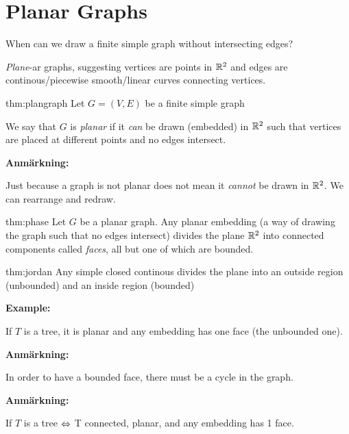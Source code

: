 \section{Planar Graphs}\par
\noindent When can we draw a finite simple graph without intersecting edges?
\par\bigskip
\noindent\textit{Plane}-ar graphs, suggesting vertices are points in $\mathbb{R}^2$ and edges are continous/piecewise smooth/linear curves connecting vertices. 
\par\bigskip
\begin{theo}{thm:plangraph}
  Let $G = (V,E)$ be a finite simple graph
  \par\bigskip
  \noindent We say that $G$ is \textit{planar} if it \textit{can} be drawn (embedded) in $\mathbb{R}^2$ such that vertices are placed at different points and no edges intersect.
\end{theo}
\par\bigskip
\noindent\textbf{Anmärkning:}\par
\noindent Just because a graph is not planar does not mean it \textit{cannot} be drawn in $\mathbb{R}^2$. We can rearrange and redraw.
\par\bigskip
\begin{theo}[Faces]{thm:phase}
  Let $G$ be a planar graph. Any planar embedding (a way of drawing the graph such that no edges intersect) divides the plane $\mathbb{R}^2$ into connected components called \textit{faces}, all but one of which are bounded. 
\end{theo}
\par\bigskip
\begin{theo}{thm:jordan}
  Any simple closed continous divides the plane into an outside region (unbounded) and an inside region (bounded)
\end{theo}
\par\bigskip
\noindent\textbf{Example:}\par
\noindent If $T$ is a tree, it is planar and any embedding has one face (the unbounded one).
\par\bigskip
\noindent\textbf{Anmärkning:}\par
\noindent In order to have a bounded face, there must be a cycle in the graph. 
\par\bigskip
\noindent\textbf{Anmärkning:}\par
\noindent If $T$ is a tree $\Leftrightarrow$ T connected, planar, and any embedding has 1 face. 
\par\bigskip
